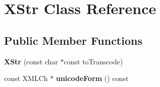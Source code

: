 \hypertarget{classXStr}{}\section{X\+Str Class Reference}
\label{classXStr}
\subsection*{Public Member Functions}
\begin{DoxyCompactItemize}
\item 
\hypertarget{classXStr_af8893bac33549ac393b484073b45721b}{}{\bfseries X\+Str} (const char $\ast$const to\+Transcode)\label{classXStr_af8893bac33549ac393b484073b45721b}

\item 
\hypertarget{classXStr_ab6727826bf48760116c08c699bfb9308}{}const X\+M\+L\+Ch $\ast$ {\bfseries unicode\+Form} () const \label{classXStr_ab6727826bf48760116c08c699bfb9308}

\end{DoxyCompactItemize}
